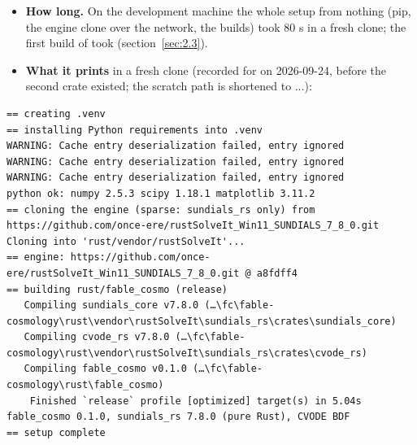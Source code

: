 \begin{itemize}
  \item \textbf{How long.} On the development machine the whole setup from nothing (pip, the engine clone over the network, the builds) took 80 s in a fresh clone; the first build of  took  (section~\ref{sec:2.3}).
  \item \textbf{What it prints} in a fresh clone (recorded for  on 2026-09-24, before the second crate existed; the scratch path is shortened to $\dots$):
\end{itemize}

\begin{Verbatim}
== creating .venv
== installing Python requirements into .venv
WARNING: Cache entry deserialization failed, entry ignored
WARNING: Cache entry deserialization failed, entry ignored
WARNING: Cache entry deserialization failed, entry ignored
python ok: numpy 2.5.3 scipy 1.18.1 matplotlib 3.11.2
== cloning the engine (sparse: sundials_rs only) from https://github.com/once-ere/rustSolveIt_Win11_SUNDIALS_7_8_0.git
Cloning into 'rust/vendor/rustSolveIt'...
== engine: https://github.com/once-ere/rustSolveIt_Win11_SUNDIALS_7_8_0.git @ a8fdff4
== building rust/fable_cosmo (release)
   Compiling sundials_core v7.8.0 (…\fc\fable-cosmology\rust\vendor\rustSolveIt\sundials_rs\crates\sundials_core)
   Compiling cvode_rs v7.8.0 (…\fc\fable-cosmology\rust\vendor\rustSolveIt\sundials_rs\crates\cvode_rs)
   Compiling fable_cosmo v0.1.0 (…\fc\fable-cosmology\rust\fable_cosmo)
    Finished `release` profile [optimized] target(s) in 5.04s
fable_cosmo 0.1.0, sundials_rs 7.8.0 (pure Rust), CVODE BDF
== setup complete
\end{Verbatim}

